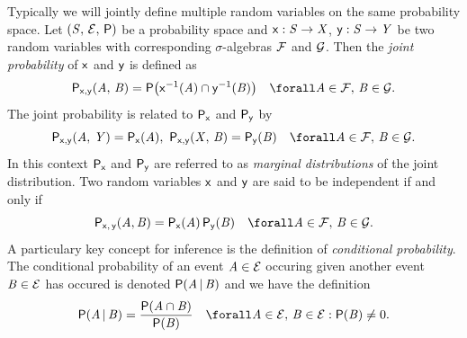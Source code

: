 Typically we will jointly define multiple random variables on the same probability space. Let $(\mathit{S},\,\mathcal{E},\,\mathsf{P})$ be a probability space and $\mathsf{x} : \mathit{S} \to \mathit{X}$, $\mathsf{y} : \mathit{S} \to \mathit{Y}$ be two random variables with corresponding $\sigma$-algebras $\mathcal{F}$ and $\mathcal{G}$. Then the \emph{joint probability} of $\mathsf{x}$ and $\mathsf{y}$ is defined as
\begin{equation}\label{eq:joint-probability-rvar}
  \prob{\rvar{x},\rvar{y}}(\set{A},\,\set{B}) = 
  \probability\lpa \rvar{x}^{-1}(\set{A}) \cap \rvar{y}^{-1}(\set{B})\rpa
  \quad \forall \set{A} \in \sset{F},\,\set{B} \in \sset{G}.
\end{equation}
The joint probability is related to $\mathsf{P}_{\mathsf{x}}$ and $\mathsf{P}_{\mathsf{y}}$ by
\begin{equation}\label{eq:sum-rule-rvar}
  \prob{\rvar{x},\rvar{y}}(\set{A},\,\set{Y}) =
  \prob{\rvar{x}}(\set{A}),~
  \prob{\rvar{x},\rvar{y}}(\set{X},\,\set{B}) =
  \prob{\rvar{y}}(\set{B})
  \quad \forall \set{A} \in \sset{F},\,\set{B} \in \sset{G}.
\end{equation}
In this context $\mathsf{P}_{\mathsf{x}}$ and $\mathsf{P}_{\mathsf{y}}$ are referred to as \emph{marginal distributions} of the joint distribution. Two random variables $\mathsf{x}$ and $\mathsf{y}$ are said to be independent if and only if
\begin{equation}\label{eq:independent-rvars}
  \prob{\rvar{x},\,\rvar{y}}(\set{A},\set{B}) = \prob{\rvar{x}}(\set{A})\,\prob{\rvar{y}}(\set{B})
  \quad \forall \set{A} \in \sset{F},\,\set{B} \in \sset{G}.
\end{equation}
A particulary key concept for inference is the definition of \emph{conditional probability}. The conditional probability of an event $\mathit{A} \in \mathcal{E}$ occuring given another event $\mathit{B} \in \mathcal{E}$ has occured is denoted $\mathsf{P}(\mathit{A} \operatorname{|} \mathit{B})$ and we have the definition
\begin{equation}\label{eq:conditional-probability}
  \probability(\set{A} \gvn \set{B}) =
  \frac{\probability(\set{A} \cap \set{B})}{\probability(\set{B})}
  \quad \forall \set{A} \in \sset{E},\,\set{B} \in \sset{E} : \probability(\set{B}) \neq 0.
\end{equation}

